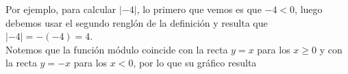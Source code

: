 \documentclass[../Teoría.root.tex]{subfiles}
\begin{document}
        Por ejemplo, para calcular \(|−4|\), lo primero que vemos es que \(−4 < 0\), luego debemos usar el segundo renglón de la definición y resulta que \(|−4|=−(−4)=4\).\\
        Notemos que la función módulo coincide con la recta \(y=x\) para los \(x\geq 0\) y con la recta \(y=−x\) para los \(x<0\), por lo que su gráfico resulta
        \begin{center}
        \end{center}
\end{document}
